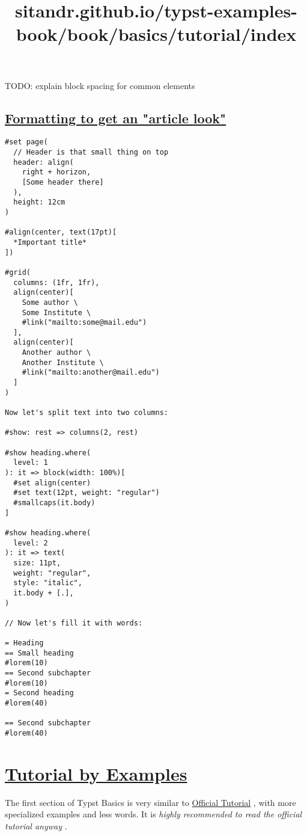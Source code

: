 TODO: explain block spacing for common elements

\subsection{\texorpdfstring{\hyperref[formatting-to-get-an-article-look]{Formatting
to get an "article
look"}}{Formatting to get an "article look"}}\label{formatting-to-get-an-article-look}

\begin{verbatim}
#set page(
  // Header is that small thing on top
  header: align(
    right + horizon,
    [Some header there]
  ),
  height: 12cm
)

#align(center, text(17pt)[
  *Important title*
])

#grid(
  columns: (1fr, 1fr),
  align(center)[
    Some author \
    Some Institute \
    #link("mailto:some@mail.edu")
  ],
  align(center)[
    Another author \
    Another Institute \
    #link("mailto:another@mail.edu")
  ]
)

Now let's split text into two columns:

#show: rest => columns(2, rest)

#show heading.where(
  level: 1
): it => block(width: 100%)[
  #set align(center)
  #set text(12pt, weight: "regular")
  #smallcaps(it.body)
]

#show heading.where(
  level: 2
): it => text(
  size: 11pt,
  weight: "regular",
  style: "italic",
  it.body + [.],
)

// Now let's fill it with words:

= Heading
== Small heading
#lorem(10)
== Second subchapter
#lorem(10)
= Second heading
#lorem(40)

== Second subchapter
#lorem(40)
\end{verbatim}

\pandocbounded{}


\title{sitandr.github.io/typst-examples-book/book/basics/tutorial/index}

\section{\texorpdfstring{\hyperref[tutorial-by-examples]{Tutorial by
Examples}}{Tutorial by Examples}}\label{tutorial-by-examples}

The first section of Typst Basics is very similar to
\href{https://typst.app/docs/tutorial/}{Official Tutorial} , with more
specialized examples and less words. It is \emph{highly recommended to
read the official tutorial anyway} .


